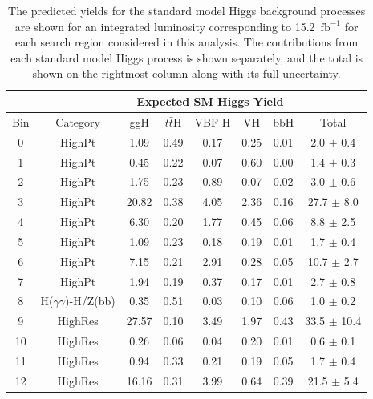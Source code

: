 \begin{table}[htb]
\begin{center}
\caption{The predicted yields for the standard model Higgs background processes 
are shown for an integrated luminosity corresponding to 15.2~$\mathrm{fb}^{-1}$ for 
each search region considered in this analysis. The contributions from 
each standard model Higgs process is shown separately, and the total 
is shown on the rightmost column along with its full uncertainty.
\label{tab:SMHBkgPrediction}
}
\def\arraystretch{1.5}
\begin{tabular}{|c|c|c|c|c|c|c|c|}
\hline
    & & \multicolumn{5}{c|}{Expected SM Higgs Yield} & \\
\hline
\small
Bin & Category & ggH & $t\bar{t}$H & VBF H & VH & bbH & Total \\
\hline
0  & HighPt & 1.09   & 0.49   & 0.17   & 0.25   & 0.01    & 2.0 $\pm$ 0.4    \\
1  & HighPt & 0.45   & 0.22   & 0.07   & 0.60   & 0.00    & 1.4 $\pm$ 0.3    \\
2  & HighPt & 1.75   & 0.23   & 0.89   & 0.07   & 0.02    & 3.0 $\pm$ 0.6    \\ 
3  & HighPt & 20.82  & 0.38   & 4.05   & 2.36   & 0.16    & 27.7 $\pm$ 8.0  \\ 
4  & HighPt & 6.30   & 0.20   & 1.77   & 0.45   & 0.06    & 8.8 $\pm$ 2.5    \\
5  & HighPt & 1.09   & 0.23   & 0.18   & 0.19   & 0.01    & 1.7 $\pm$ 0.4    \\
6  & HighPt & 7.15   & 0.21   & 2.91   & 0.28   & 0.05    & 10.7 $\pm$ 2.7   \\
7  & HighPt & 1.94   & 0.19   & 0.37   & 0.17   & 0.01    & 2.7 $\pm$ 0.8    \\
\hline                                                                     
8  & H($\gamma\gamma$)-H/Z(bb)   & 0.35   & 0.51   & 0.03   & 0.10   & 0.06    & 1.0 $\pm$ 0.2    \\
\hline                                                                     
9  & HighRes & 27.57 & 0.10   & 3.49   & 1.97   & 0.43    & 33.5 $\pm$ 10.4  \\   
10 & HighRes & 0.26  & 0.06   & 0.04   & 0.20   & 0.01    & 0.6 $\pm$ 0.1    \\     
11 & HighRes & 0.94  & 0.33   & 0.21   & 0.19   & 0.05    & 1.7 $\pm$ 0.4    \\    
12 & HighRes & 16.16 & 0.31   & 3.99   & 0.64   & 0.39    & 21.5 $\pm$ 5.4   \\   

\end{tabular}
\end{center}
\end{table}
